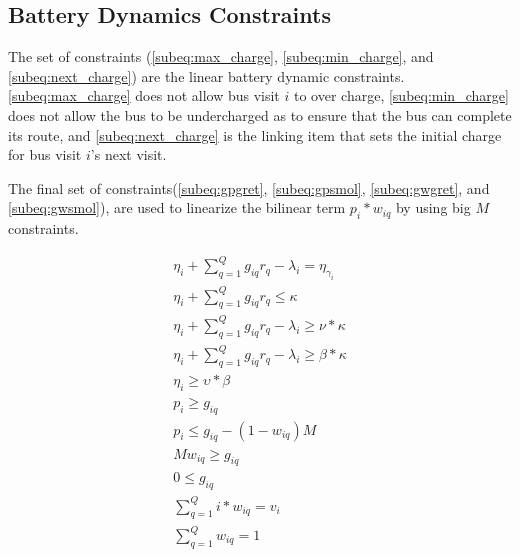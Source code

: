 \documentclass[letterpaper, 10pt, conference]{IEEEtran}
\begin{document}
\subsection{Battery Dynamics Constraints}
The set of constraints (\eqref{subeq:max_charge}, \eqref{subeq:min_charge}, and \eqref{subeq:next_charge}) are the linear battery dynamic constraints. \eqref{subeq:max_charge} does not allow bus visit \(i\) to over charge, \eqref{subeq:min_charge} does not allow the bus to be undercharged as to ensure that the bus can complete its route, and \eqref{subeq:next_charge} is the linking item that sets the initial charge for bus visit \(i\)'s next visit.

The final set of constraints(\eqref{subeq:gpgret}, \eqref{subeq:gpsmol}, \eqref{subeq:gwgret}, and \eqref{subeq:gwsmol}), are used to linearize the bilinear term \(p_i*w_{iq}\) by using big \(M\) constraints.

\begin{subequations}
\label{eq:dynconstrs}
\begin{align}
    \eta_i + \sum_{q=1}^Q g_{iq} r_q - \lambda_i = \eta_{\gamma_i}   \label{subeq:next_charge}  \\
    \eta_i + \sum_{q=1}^Q g_{iq} r_q \leq \kappa                     \label{subeq:max_charge}   \\
    \eta_i + \sum_{q=1}^Q g_{iq} r_q - \lambda_i \geq \nu * \kappa   \label{subeq:min_charge}   \\
    \eta_i + \sum_{q=1}^Q g_{iq} r_q - \lambda_i \geq \beta * \kappa \label{subeq:final_charge} \\
    \eta_i \geq \upsilon * \beta                                     \label{subeq:final_charge} \\
    p_i \geq g_{iq}                                                  \label{subeq:gpgret}       \\
    p_i \leq g_{iq} - (1 - w_{iq})M                                  \label{subeq:gpsmol}       \\
    Mw_{iq} \geq g_{iq}                                              \label{subeq:gwgret}       \\
    0 \leq g_{iq}                                                    \label{subeq:gwsmol}       \\
    \sum_{q=1}^Q i*w_{iq} = v_i                                      \label{subeq:wmax}         \\
    \sum_{q=1}^Q w_{iq} = 1                                          \label{subeq:wone}
\end{align}
\end{subequations}
\end{document}
